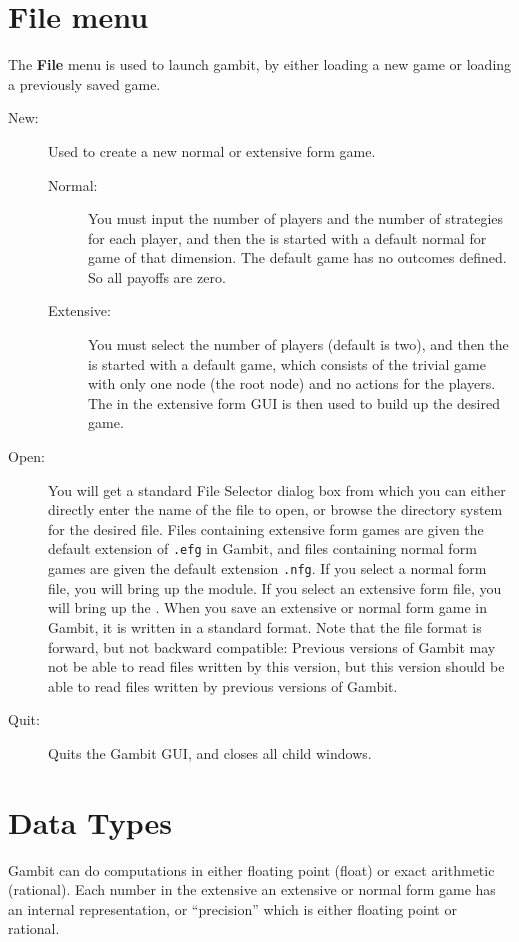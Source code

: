 \section{File menu}

The {\bf File} menu is used to launch gambit, by either loading a new
game or loading a previously saved game.

\begin{description}
\item[New:] Used to create a new normal or extensive form game. 
\begin{description}
\item[Normal:] You must input the number of players and the number of
strategies for each player, and then the  is started with a default normal for game of that
dimension.  The default game has no outcomes defined.  So all payoffs
are zero.
\item[Extensive:] You must select the number of players (default is
two), and then the  is started with
a default game, which consists of the trivial game with only one node
(the root node) and no actions for the players.  The  in the extensive form GUI is then used to build up the
desired game.
\end{description}
\item[Open:] You will get a standard File Selector dialog box from
which you can either directly enter the name of the file to open, or
browse the directory system for the desired file.  Files containing
extensive form games are given the default extension of \verb+.efg+ in
Gambit, and files containing normal form games are given the default
extension \verb+.nfg+. If you select a normal form file, you will
bring up the  module.  If you select
an extensive form file, you will bring up the .  When you save an extensive or normal form game in
Gambit, it is written in a standard format. Note that the file format
is forward, but not backward compatible: Previous versions of Gambit
may not be able to read files written by this version, but this
version should be able to read files written by previous versions of
Gambit.
\item[Quit:] Quits the Gambit GUI, and closes all child windows.  
\end{description}

\section{Data Types}\label{DataTypes}
Gambit can do computations in either floating point (float) or
exact arithmetic (rational).  Each number in the extensive an extensive 
or normal form game has an internal representation, or ``precision'' which is 
either floating point or rational.  

